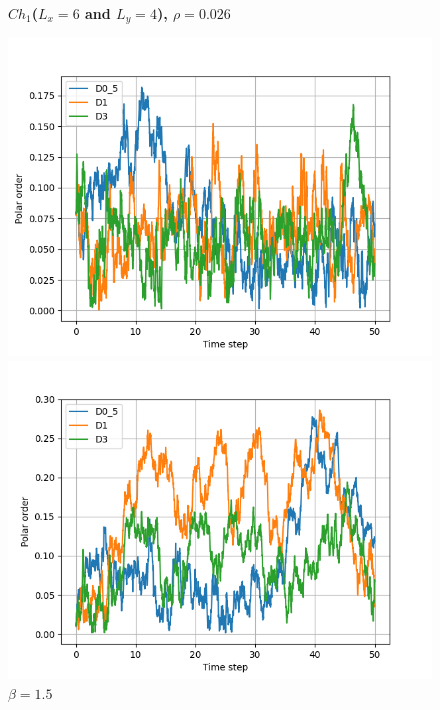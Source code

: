 \documentclass{article}
\begin{document}
\begin{figure}[H]
    \centering
    \textbf{$Ch_1$($L_x = 6$ and $L_y = 4$), $\rho = 0.026$}\par\medskip
    \begin{minipage}{0.49\textwidth}
        \includegraphics[width=1\textwidth]{videos/simulations/sim_D/beta0/dens_0_26/combined_polars.png}
        \caption{\footnotesize $\beta = 0$}
    \end{minipage}\hfill
    \begin{minipage}{0.49\textwidth}
        \includegraphics[width=1\textwidth]{videos/simulations/sim_D/beta1_5/dens_0_26/combined_polars.png}
        \caption{\footnotesize $\beta = 1.5$}
    \end{minipage}

\end{figure}
\end{document}
